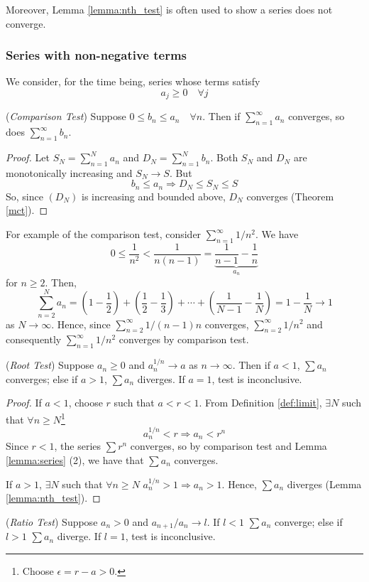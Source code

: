 \documentclass[10pt, a4paper, twoside]{report}
\begin{document}
Moreover, Lemma \ref{lemma:nth_test} is often used to show a series does not converge. 


\subsubsection{Series with non-negative terms}
We consider, for the time being, series whose terms satisfy 
\[a_j\geq 0\quad\forall j\]
\begin{theorem}
    (\emph{Comparison Test})
    Suppose \(0\leq b_n\leq a_n\quad\forall n\). Then if \(\sum_{n=1}^{\infty}a_n\) converges, so does \(\sum_{n=1}^{\infty}b_n\).
    \label{thm:comparison_test}
\end{theorem}
\begin{proof}
    Let \(S_N=\sum_{n=1}^{N}a_n\) and \(D_N=\sum_{n=1}^{N}b_n\). Both \(S_N\) and \(D_N\) are monotonically increasing and \(S_N\to S\). But
    \[b_n\leq a_n\Rightarrow D_N\leq S_N\leq S\]
    So, since \((D_N)\) is increasing and bounded above, \(D_N\) converges (Theorem \ref{mct}).
\end{proof}
For example of the comparison test, consider \(\sum_{n=1}^{\infty}1/n^2\). We have
\[0\leq\frac{1}{n^2}<\frac{1}{n(n-1)}=\underbrace{\frac{1}{n-1}-\frac 1n}_{a_n}\]
for \(n\geq 2\). Then,
\[\sum_{n=2}^{N}a_n=\left(1-\frac 12\right)+\left(\frac 12-\frac 13\right)+\cdots+\left(\frac 1{N-1}-\frac 1N\right)=1-\frac 1N\to 1\]
as \(N\to\infty\).
Hence, since \(\sum_{n=2}^{\infty}1/(n-1)n\) converges, \(\sum_{n=2}^{\infty}1/n^2\) and consequently \(\sum_{n=1}^{\infty}1/n^2\) converges by comparison test.
\begin{theorem}
    (\emph{Root Test}) Suppose \(a_n\geq 0\) and \(a_n^{1/n}\to a\) as \(n\to\infty\). Then if \(a<1\), \(\sum a_n\) converges; else if \(a>1\), \(\sum a_n\) diverges. If \(a=1\), test is inconclusive.
\end{theorem}
\begin{proof}
    If \(a<1\), choose \(r\) such that \(a<r<1\). From Definition \ref{def:limit}, \(\exists N\) such that \(\forall n\geq N\)\footnote{Choose \(\epsilon=r-a>0\).} 
    \[a_n^{1/n}<r\Rightarrow a_n<r^n\]
    Since \(r<1\), the series \(\sum r^n\) converges, so by comparison test and Lemma \ref{lemma:series} (2), we have that \(\sum a_n\) converges.

    If \(a>1\), \(\exists N\) such that \(\forall n\geq N\) \(a_n^{1/n}>1\Rightarrow a_n>1\). Hence, \(\sum a_n\) diverges (Lemma \ref{lemma:nth_test}).
\end{proof}
\begin{theorem}
    (\emph{Ratio Test}) Suppose \(a_n>0\) and \(a_{n+1}/a_n\to l\). If \(l<1\) \(\sum a_n\) converge; else if \(l>1\) \(\sum a_n\) diverge. If \(l=1\), test is inconclusive.
\end{theorem}
\end{document}
